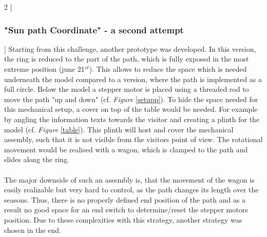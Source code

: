 \documentclass[a4paper,9pt]{article}
\begin{document}
\begin{multicols}{2}
    [
    \subsubsection{"Sun path Coordinate" - a second attempt }
    ]
     Starting from this challenge, another prototype was developed. In this version, the ring is reduced to the part of the path, which is fully exposed in the most extreme position (june 21$^{st}$). This allows to reduce the space which is needed underneath the model compared to a version, where the path is implemented as a full circle. Below the model a stepper motor is placed using a threaded rod to move the path "up and down" (cf. \textit{Figure} \ref{setupp}). To hide the space needed for this mechanical setup, a cover on top of the table would be needed. For example by angling the information texts towards the visitor and creating a plinth for the model (cf. \textit{Figure} \ref{table}). This plinth will host and cover the mechanical assembly, such that it is not visible from the visitors point of view. The rotational movement would be realised with a wagon, which is clamped to the path and slides along the ring. \\
     \\
     The major downside of such an assembly is, that the movement of the wagon is easily realizable but very hard to control, as the path changes its length over the seasons. Thus, there is no properly defined end position of the path and as a result no good space for an end switch to determine/reset the stepper motors position. Due to these complexities with this strategy, another strategy was chosen in the end.
\end{multicols}
\end{document}
